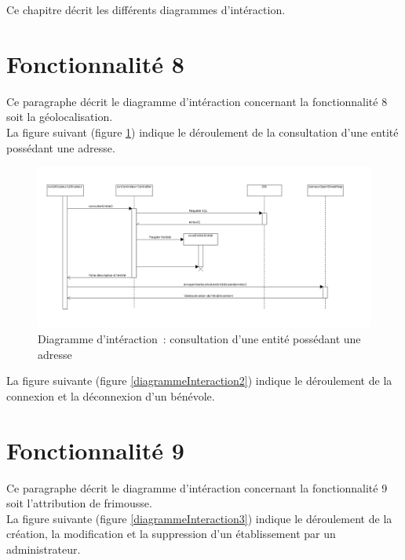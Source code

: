 Ce chapitre décrit les différents diagrammes d'intéraction.

\section{Fonctionnalité 8}
Ce paragraphe décrit le diagramme d'intéraction concernant la fonctionnalité 8 soit la géolocalisation. \\

La figure suivant (figure \ref{diagrammeInteraction1}) indique le déroulement de la consultation d'une entité possédant une adresse.
\begin{figure}[H]
	\centering
	\includegraphics[scale=0.39]{images/diagrammesInteraction/01_diagrammeInteractionF8.png}
	\caption{Diagramme d'intéraction~: consultation d'une entité possédant une adresse}
	\label{diagrammeInteraction1}
\end{figure}

La figure suivante (figure \ref{diagrammeInteraction2}) indique le déroulement de la connexion et la déconnexion d'un bénévole.

\section{Fonctionnalité 9}
Ce paragraphe décrit le diagramme d'intéraction concernant la fonctionnalité 9 soit l'attribution de frimousse. \\

La figure suivante (figure \ref{diagrammeInteraction3}) indique le déroulement de la création, la modification et la suppression d'un établissement par un administrateur.

